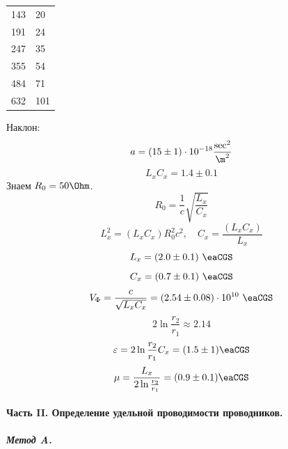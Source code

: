 \documentclass{report}
\begin{document}
\begin{table}[H]
\begin{tabular}{|l|l|}
		143                     & 20                    \\
		191                     & 24                    \\
		247                     & 35                    \\
		355                     & 54                    \\
		484                     & 71                    \\
		632                     & 101                   \\
		\hline
	\end{tabular}
\end{table}

Наклон:
\[
	a = (15 \pm 1) \cdot 10^{-18} \frac{\sec^2}{\m^2}
\]
\[
	L_x C_x = 1.4 \pm 0.1
\]
Знаем $R_0 = 50 \Ohm$.
$$
	R_0 = \frac{1}{c} \sqrt{\frac{L_x}{C_x}}
$$
$$
	L_x^2 = (L_x C_x) R_0^2 c^2, \quad C_x = \frac{(L_x C_x)}{L_x}
$$
$$
	L_x = (2.0 \pm 0.1)\ \eaCGS
$$
$$
	C_x = (0.7 \pm 0.1)\ \eaCGS
$$
$$
	V_\Phi = \frac{c}{\sqrt{L_x C_x}} = (2.54 \pm 0.08) \cdot 10^{10}\ \eaCGS
$$
$$
	2 \ln\frac{r_2}{r_1} \approx 2.14
$$
$$
	\varepsilon = 2 \ln\frac{r_2}{r_1} C_x = (1.5 \pm 1) \eaCGS
$$
$$
	\mu = \frac{L_x}{2 \ln\frac{r_2}{r_1}} = (0.9 \pm 0.1) \eaCGS
$$

\paragraph{Часть II. Определение удельной проводимости проводников.}
\subparagraph{Метод A.} \\
\end{document}
